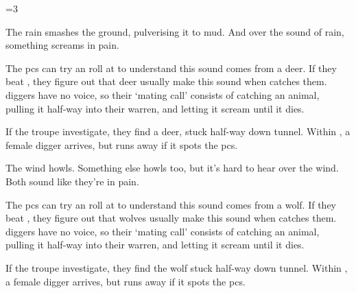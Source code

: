 \ifnum\value{cycle}=3

\ifodd\value{r2}


  \begin{boxtext}
    The rain smashes the ground, pulverising it to mud.
    And over the sound of rain, something screams in pain.
  \end{boxtext}

  The \glspl{pc} can try an  roll at \tn[10] to understand this sound comes from a deer.
  If they beat \tn[12], they figure out that deer usually make this sound when  catches them.
  \Glspl{digger} have no voice, so their `mating call' consists of catching an animal, pulling it half-way into their warren, and letting it scream until it dies.

  If the troupe investigate, they find a deer, stuck half-way down  tunnel.
  Within , a female \gls{digger} arrives, but runs away if it spots the \glspl{pc}.

\else


  \begin{boxtext}
    The wind howls.
    Something else howls too, but it's hard to hear over the wind.
    Both sound like they're in pain.
  \end{boxtext}

  The \glspl{pc} can try an  roll at \tn[10] to understand this sound comes from a wolf.
  If they beat \tn[12], they figure out that wolves usually make this sound when  catches them.
  \Glspl{digger} have no voice, so their `mating call' consists of catching an animal, pulling it half-way into their warren, and letting it scream until it dies.

  If the troupe investigate, they find the wolf stuck half-way down  tunnel.
  Within , a female \gls{digger} arrives, but runs away if it spots the \glspl{pc}.

\fi

\fi
